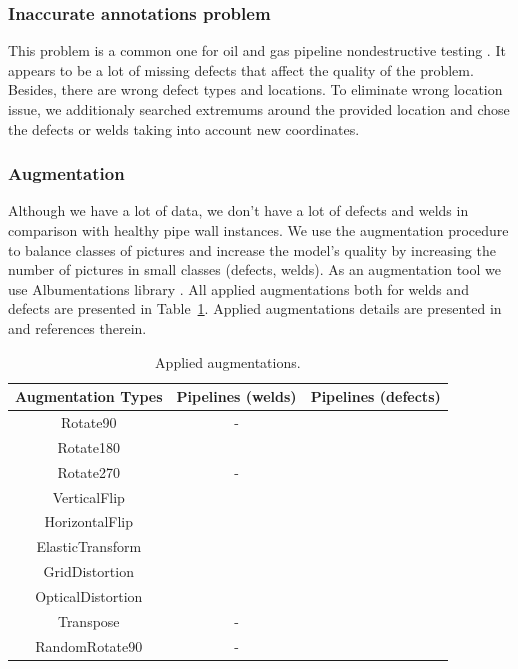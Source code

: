 \subsubsection{Inaccurate annotations problem}
This problem is a common one for oil and gas pipeline nondestructive testing \cite{Khodayari-Rostamabad2009}.
It appears to be a lot of missing defects that affect the quality of the problem.
Besides, there are wrong defect types and locations.
To eliminate wrong location issue, we additionaly searched extremums around the provided location and chose the defects or welds taking into account new coordinates.

\subsubsection{Augmentation}
Although we have a lot of data, we don't have a lot of defects and welds in comparison with healthy pipe wall instances.
We use the augmentation procedure to balance classes of pictures and increase the model's quality by increasing the number of pictures in small classes (defects, welds).
As an augmentation tool we use Albumentations library \cite{buslaev2020albumentations}.
All applied augmentations both for welds and defects are presented in Table~\ref{tab:aug}.
Applied augmentations details are presented in \cite{buslaev2020albumentations} and references therein.

\begin{table}[!htb]
	\caption{Applied augmentations.}
	\begin{center}
		\small
		\begin{tabular}{ c | c | c  }
			\hline
			Augmentation Types & Pipelines (welds) & Pipelines (defects) \\
			\hline
			Rotate90 &  - & \checkmark \\
			Rotate180 & \checkmark & \checkmark \\
			Rotate270 &  - & \checkmark \\
			VerticalFlip & \checkmark & \checkmark \\
			HorizontalFlip & \checkmark & \checkmark \\
			ElasticTransform & \checkmark & \checkmark \\
			GridDistortion & \checkmark & \checkmark \\
			OpticalDistortion & \checkmark & \checkmark \\
			Transpose & - & \checkmark \\
			RandomRotate90 &  - & \checkmark \\
			\hline
		\end{tabular}
		\label{tab:aug}
	\end{center}
\end{table}


